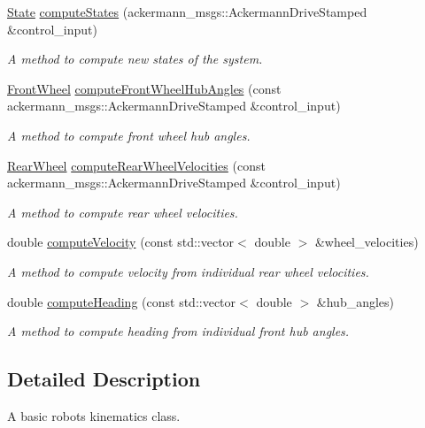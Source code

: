 \begin{DoxyCompactItemize}
\hyperlink{structState}{State} \hyperlink{classKinematics_abc359954c01ed158fe090e01b5539f06}{compute\+States} (ackermann\+\_\+msgs\+::\+Ackermann\+Drive\+Stamped \&control\+\_\+input)
\begin{DoxyCompactList}\small\item\em A method to compute new states of the system. \end{DoxyCompactList}\item 
\hyperlink{structFrontWheel}{Front\+Wheel} \hyperlink{classKinematics_af5e5528ca44f82edae99025410595a36}{compute\+Front\+Wheel\+Hub\+Angles} (const ackermann\+\_\+msgs\+::\+Ackermann\+Drive\+Stamped \&control\+\_\+input)
\begin{DoxyCompactList}\small\item\em A method to compute front wheel hub angles. \end{DoxyCompactList}\item 
\hyperlink{structRearWheel}{Rear\+Wheel} \hyperlink{classKinematics_ac2733720e49bcd20662e74ea9334a878}{compute\+Rear\+Wheel\+Velocities} (const ackermann\+\_\+msgs\+::\+Ackermann\+Drive\+Stamped \&control\+\_\+input)
\begin{DoxyCompactList}\small\item\em A method to compute rear wheel velocities. \end{DoxyCompactList}\item 
double \hyperlink{classKinematics_a7159c40fdd982621f5def3e8aeb5687d}{compute\+Velocity} (const std\+::vector$<$ double $>$ \&wheel\+\_\+velocities)
\begin{DoxyCompactList}\small\item\em A method to compute velocity from individual rear wheel velocities. \end{DoxyCompactList}\item 
double \hyperlink{classKinematics_a333f2e56be9d8eda2ff9ed4217dac860}{compute\+Heading} (const std\+::vector$<$ double $>$ \&hub\+\_\+angles)
\begin{DoxyCompactList}\small\item\em A method to compute heading from individual front hub angles. \end{DoxyCompactList}\end{DoxyCompactItemize}


\subsection{Detailed Description}
A basic robot\textquotesingle{}s kinematics class. 

